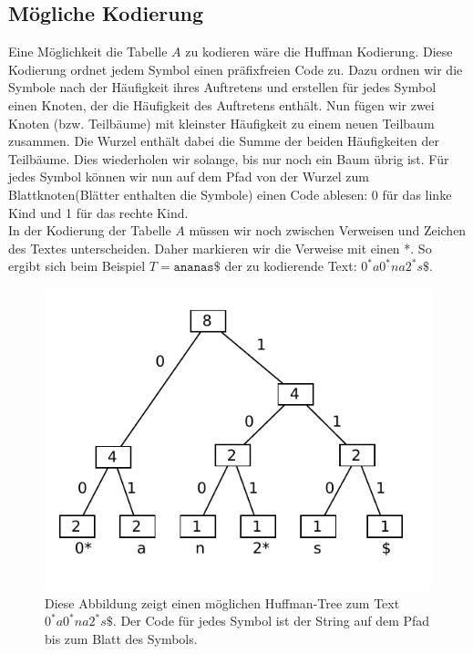 \documentclass[a4paper,11pt]{scrartcl}%
\theoremstyle{change}
\theoremstyle{nonumberplain}
\theoremstyle{change}
\theoremstyle{nonumberplain}
\theoremstyle{change}
\theoremstyle{nonumberplain}
\begin{document}
		
		
	
	
	
	
	\subsection{Mögliche Kodierung}
	
	Eine Möglichkeit die Tabelle $A$ zu kodieren wäre die Huffman Kodierung. Diese Kodierung ordnet jedem Symbol einen präfixfreien Code zu. Dazu ordnen wir die Symbole nach der Häufigkeit ihres Auftretens und erstellen für jedes Symbol einen Knoten, der die Häufigkeit des Auftretens enthält. Nun fügen wir zwei Knoten (bzw. Teilbäume) mit kleinster Häufigkeit zu einem neuen Teilbaum zusammen. Die Wurzel enthält dabei die Summe der beiden Häufigkeiten der Teilbäume. Dies wiederholen wir solange, bis nur noch ein Baum übrig ist. Für jedes Symbol können wir nun auf dem Pfad von der Wurzel zum Blattknoten(Blätter enthalten die Symbole) einen Code ablesen: 0 für das linke Kind und 1 für das rechte Kind. \\
	In der Kodierung der Tabelle $A$ müssen wir noch zwischen Verweisen und Zeichen des Textes unterscheiden. Daher markieren wir die Verweise mit einen *. So ergibt sich beim Beispiel $T = \texttt{ananas\$}$ der zu kodierende Text: \texttt{$0^*a0^*na2^*s\$$}.
	\begin{figure}[h]
			\centering
			\includegraphics[scale=0.8]{./pics/huffmanTree}
			\caption{Diese Abbildung zeigt einen möglichen Huffman-Tree zum Text \texttt{$0^*a0^*na2^*s\$$}. Der Code für jedes Symbol ist der String auf dem Pfad bis zum Blatt des Symbols.}
			\label{fig:huffman}
	\end{figure}
\end{document}
